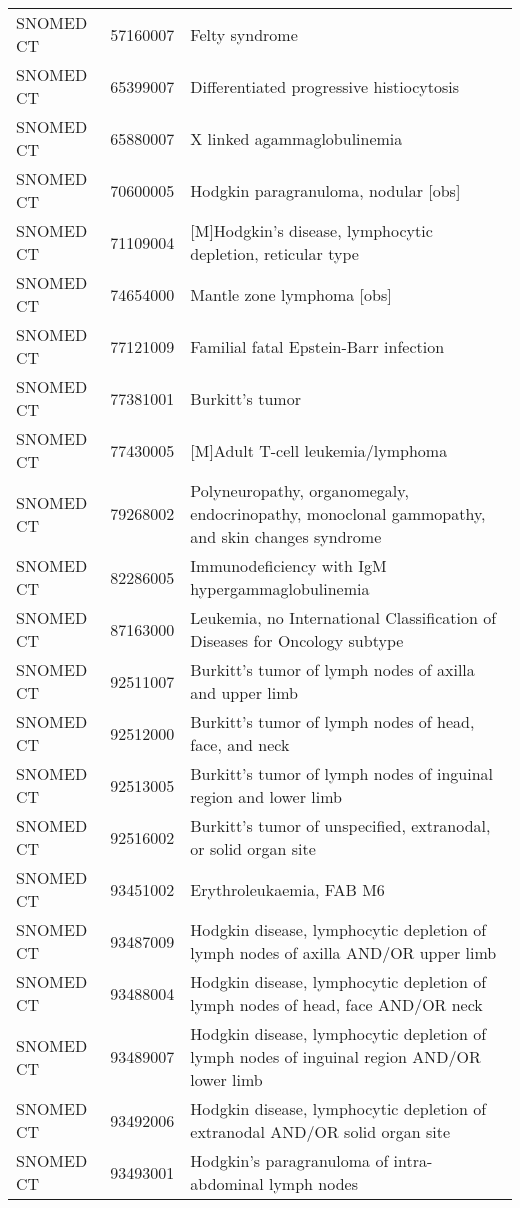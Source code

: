 \begin{longtable}{p{}p{}p{}}
  SNOMED CT & 57160007 & Felty syndrome \\ 
  SNOMED CT & 65399007 & Differentiated progressive histiocytosis \\ 
  SNOMED CT & 65880007 & X linked agammaglobulinemia \\ 
  SNOMED CT & 70600005 & Hodgkin paragranuloma, nodular [obs] \\ 
  SNOMED CT & 71109004 & [M]Hodgkin's disease, lymphocytic depletion, reticular type \\ 
  SNOMED CT & 74654000 & Mantle zone lymphoma [obs] \\ 
  SNOMED CT & 77121009 & Familial fatal Epstein-Barr infection \\ 
  SNOMED CT & 77381001 & Burkitt's tumor \\ 
  SNOMED CT & 77430005 & [M]Adult T-cell leukemia/lymphoma \\ 
  SNOMED CT & 79268002 & Polyneuropathy, organomegaly, endocrinopathy, monoclonal gammopathy, and skin changes syndrome \\ 
  SNOMED CT & 82286005 & Immunodeficiency with IgM hypergammaglobulinemia \\ 
  SNOMED CT & 87163000 & Leukemia, no International Classification of Diseases for Oncology subtype \\ 
  SNOMED CT & 92511007 & Burkitt's tumor of lymph nodes of axilla and upper limb \\ 
  SNOMED CT & 92512000 & Burkitt's tumor of lymph nodes of head, face, and neck \\ 
  SNOMED CT & 92513005 & Burkitt's tumor of lymph nodes of inguinal region and lower limb \\ 
  SNOMED CT & 92516002 & Burkitt's tumor of unspecified, extranodal, or solid organ site \\ 
  SNOMED CT & 93451002 & Erythroleukaemia, FAB M6 \\ 
  SNOMED CT & 93487009 & Hodgkin disease, lymphocytic depletion of lymph nodes of axilla AND/OR upper limb \\ 
  SNOMED CT & 93488004 & Hodgkin disease, lymphocytic depletion of lymph nodes of head, face AND/OR neck \\ 
  SNOMED CT & 93489007 & Hodgkin disease, lymphocytic depletion of lymph nodes of inguinal region AND/OR lower limb \\ 
  SNOMED CT & 93492006 & Hodgkin disease, lymphocytic depletion of extranodal AND/OR solid organ site \\ 
  SNOMED CT & 93493001 & Hodgkin's paragranuloma of intra-abdominal lymph nodes \\ 

\end{longtable}
